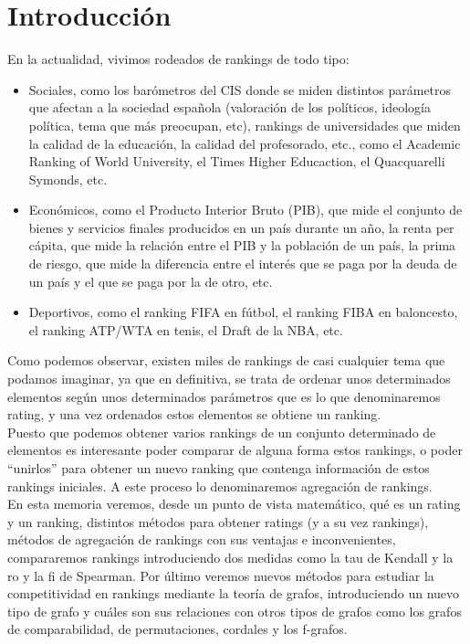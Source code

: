 \chapter{Introducción} \label{chp:introduccion}


En la actualidad, vivimos rodeados de rankings de todo tipo: 
\begin{itemize}
\item Sociales, como los barómetros del CIS donde se miden distintos parámetros que afectan a la sociedad española (valoración de los políticos, ideología política, tema que más preocupan, etc), rankings de universidades que miden la calidad de la educación, la calidad del profesorado, etc., como el Academic Ranking of World University, el Times Higher Educaction, el Quacquarelli Symonds, etc.
\item Económicos, como el Producto Interior Bruto (PIB), que mide el conjunto de bienes y servicios finales producidos en un país durante un año, la renta per cápita, que mide la relación entre el PIB y la población de un país, la prima de riesgo, que mide la diferencia entre el interés que se paga por la deuda de un país y el que se paga por la de otro, etc.
\item Deportivos, como el ranking FIFA en fútbol, el ranking FIBA en baloncesto, el ranking ATP/WTA en tenis, el Draft de la NBA, etc.
\end{itemize}

Como podemos observar, existen miles de rankings de casi cualquier tema que podamos imaginar, ya que en definitiva, se trata de ordenar unos determinados elementos según unos determinados parámetros que es lo que denominaremos rating, y una vez ordenados estos elementos se obtiene un ranking.\\

Puesto que podemos obtener varios rankings de un conjunto determinado de elementos es interesante poder comparar de alguna forma estos rankings, o poder ``unirlos'' para obtener un nuevo ranking que contenga información de estos rankings iniciales. A este proceso lo denominaremos agregación de rankings.\\

En esta memoria veremos, desde un punto de vista matemático, qué es un rating y un ranking, distintos métodos para obtener ratings (y a su vez rankings), métodos de agregación de rankings con sus ventajas e inconvenientes, compararemos rankings introduciendo dos medidas como la tau de Kendall y la ro y la fi de Spearman. Por último veremos nuevos métodos para estudiar la competitividad en rankings mediante la teoría de grafos, introduciendo un nuevo tipo de grafo y cuáles son sus relaciones con otros tipos de grafos como los grafos de comparabilidad, de permutaciones, cordales y los f-grafos.